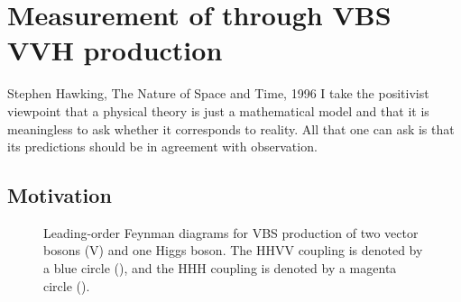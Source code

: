 \chapter{Measurement of \kVV through VBS VVH production}
\begin{aquote}{Stephen Hawking, The Nature of Space and Time, 1996}
    I take the positivist viewpoint that a physical theory is just a mathematical model and that it is meaningless to ask whether it corresponds to reality. 
    All that one can ask is that its predictions should be in agreement with observation. 
\end{aquote}
\section{Motivation}
\begin{figure}[htb]
    \centering
    \quad
    \quad
    \caption{
        Leading-order Feynman diagrams for VBS production of two vector bosons (V) and one Higgs boson. 
        The HHVV coupling \kVV is denoted by a blue circle (\textcolor{blue}{}), and the HHH coupling \kHHH is denoted by a magenta circle (\textcolor{magenta}{}). 
    }
    \label{fig:vbsvvh_feynman}
\end{figure}
